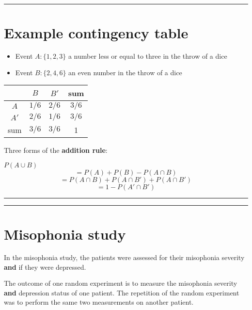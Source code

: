 \documentclass[
]{book}
\providecommand{\tightlist}{%
  \setlength{\itemsep}{0pt}\setlength{\parskip}{0pt}}
\begin{document}
\begin{center}\rule{0.5\linewidth}{0.5pt}\end{center}

\hypertarget{example-contingency-table}{%
\section{Example contingency table}\label{example-contingency-table}}

\begin{itemize}
\tightlist
\item
  Event \(A:\{1,2,3\}\) a number less or equal to three in the throw of a dice\\
\item
  Event \(B:\{2,4,6\}\) an even number in the throw of a dice
\end{itemize}

\begin{longtable}[]{@{}cccc@{}}
\toprule
& \(B\) & \(B'\) & sum \\
\midrule
\endhead
\(A\) & \(1/6\) & \(2/6\) & \(3/6\) \\
\(A'\) & \(2/6\) & \(1/6\) & \(3/6\) \\
sum & \(3/6\) & \(3/6\) & 1 \\
\bottomrule
\end{longtable}

Three forms of the \textbf{addition rule}:

\(P(A \cup B)\)\[=P(A) + P(B) - P(A\cap B)\]
\[=P(A \cap B)+P(A\cap B')+P(A\cap B')\]
\[=1-P(A'\cap B')\]

\begin{center}\rule{0.5\linewidth}{0.5pt}\end{center}

\begin{center}\rule{0.5\linewidth}{0.5pt}\end{center}

\hypertarget{misophonia-study}{%
\section{Misophonia study}\label{misophonia-study}}

In the misophonia study, the patients were assessed for their misophonia severity \textbf{and} if they were depressed.

The outcome of one random experiment is to measure the misophonia severity \textbf{and} depression status of one patient. The repetition of the random experiment was to perform the same two measurements on another patient.
\end{document}
